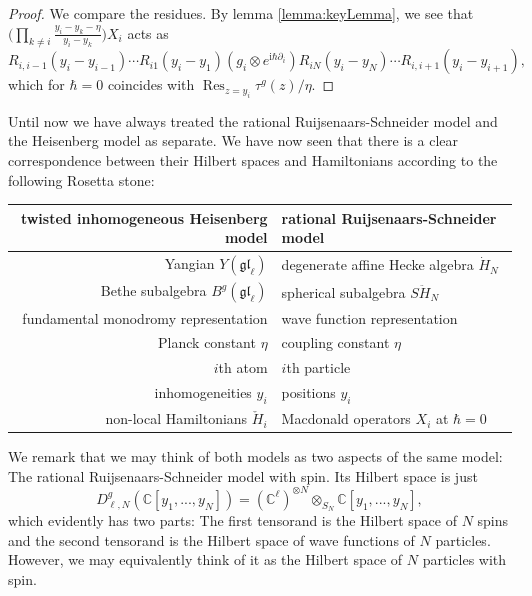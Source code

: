 \documentclass[11pt]{report}
\theoremstyle{definition}
\theoremstyle{remark}
\theoremstyle{remark}
\newcommand{\C}{\mathbb{C}}
\newcommand{\I}{\mathrm{i}}
\begin{document}
\begin{proof}
We compare the residues. By lemma \ref{lemma:keyLemma}, we see that $\bigg( \prod_{k \neq i} \frac{y_i-y_k-\eta}{y_i-y_k} \bigg) X_i$ acts as
\begin{equation*}
R_{i,i-1}(y_i-y_{i-1}) \cdots R_{i1}(y_i-y_1) (g_i \otimes e^{\I \hbar \partial_i}) R_{iN}(y_i-y_N) \cdots R_{i,i+1}(y_i-y_{i+1}),
\end{equation*}
which for $\hbar = 0$ coincides with $\operatorname{Res}_{z=y_i} \tau^g(z)/\eta$.
\end{proof}

Until now we have always treated the rational Ruijsenaars-Schneider model and the Heisenberg model as separate. We have now seen that there is a clear correspondence between their Hilbert spaces and Hamiltonians according to the following Rosetta stone:
\begin{center}
\begin{tabular}{|r||l|}
\hline
twisted inhomogeneous Heisenberg model & rational Ruijsenaars-Schneider model \\
\hline
Yangian $Y(\mathfrak{gl}_\ell)$ & degenerate affine Hecke algebra $\dot H_N$ \\
Bethe subalgebra $B^g(\mathfrak{gl}_\ell)$ & spherical subalgebra $S\ddot H_N$ \\
fundamental monodromy representation & wave function representation \\
Planck constant $\eta$ & coupling constant $\eta$ \\
$i$th atom & $i$th particle \\
inhomogeneities $y_i$ & positions $y_i$ \\
non-local Hamiltonians $\check H_i$ & Macdonald operators $X_i$ at $\hbar = 0$ \\
\hline
\end{tabular}
\end{center}
We remark that we may think of both models as two aspects of the same model: The rational Ruijsenaars-Schneider model with spin. Its Hilbert space is just
\begin{equation*}
D_{\ell,N}^g(\C[y_1,...,y_N]) = (\C^\ell)^{\otimes N} \otimes_{S_N} \C[y_1,...,y_N],
\end{equation*}
which evidently has two parts: The first tensorand is the Hilbert space of $N$ spins and the second tensorand is the Hilbert space of wave functions of $N$ particles. However, we may equivalently think of it as the Hilbert space of $N$ particles with spin.
\end{document}
